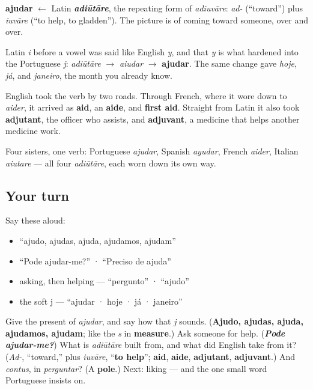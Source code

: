 \begin{cousinweb}
\textbf{ajudar} $\leftarrow$ Latin \emph{\textbf{adiūtāre}}, the repeating form of \emph{adiuvāre}: \emph{ad-} (\textquotedblleft{}toward\textquotedblright{}) plus \emph{iuvāre} (\textquotedblleft{}to help, to gladden\textquotedblright{}). The picture is of coming toward someone, over and over.

Latin \emph{i} before a vowel was said like English \emph{y}, and that \emph{y} is what hardened into the Portuguese \emph{j}: \emph{adiūtāre} $\to$ \emph{aiudar} $\to$ \textbf{ajudar}. The same change gave \emph{hoje}, \emph{já}, and \emph{janeiro}, the month you already know.

English took the verb by two roads. Through French, where it wore down to \emph{aider}, it arrived as \textbf{aid}, an \textbf{aide}, and \textbf{first aid}. Straight from Latin it also took \textbf{adjutant}, the officer who assists, and \textbf{adjuvant}, a medicine that helps another medicine work.

Four sisters, one verb: Portuguese \emph{ajudar}, Spanish \emph{ayudar}, French \emph{aider}, Italian \emph{aiutare} — all four \emph{adiūtāre}, each worn down its own way.
\end{cousinweb}

\subsection*{Your turn}
Say these aloud:

\begin{itemize}
\raggedright
  \item \textquotedblleft{}ajudo, ajudas, ajuda, ajudamos, ajudam\textquotedblright{}
  \item \textquotedblleft{}Pode ajudar-me?\textquotedblright{} · \textquotedblleft{}Preciso de ajuda\textquotedblright{}
  \item asking, then helping — \textquotedblleft{}pergunto\textquotedblright{} · \textquotedblleft{}ajudo\textquotedblright{}
  \item the soft j — \textquotedblleft{}ajudar · hoje · já · janeiro\textquotedblright{}
\end{itemize}

\begin{tcolorbox}[breakable,colback=teal!4,colframe=teal!35!black,title={Before you move on}]
Give the present of \emph{ajudar}, and say how that \emph{j} sounds. (\textbf{Ajudo, ajudas, ajuda, ajudamos, ajudam}; like the \emph{s} in \textbf{measure}.) Ask someone for help. (\emph{\textbf{Pode ajudar-me?}}) What is \emph{adiūtāre} built from, and what did English take from it? (\emph{Ad-}, \textquotedblleft{}toward,\textquotedblright{} plus \emph{iuvāre}, \textquotedblleft{}\textbf{to help}\textquotedblright{}; \textbf{aid}, \textbf{aide}, \textbf{adjutant}, \textbf{adjuvant}.) And \emph{contus}, in \emph{perguntar}? (A \textbf{pole}.) Next: liking — and the one small word Portuguese insists on.
\end{tcolorbox}
